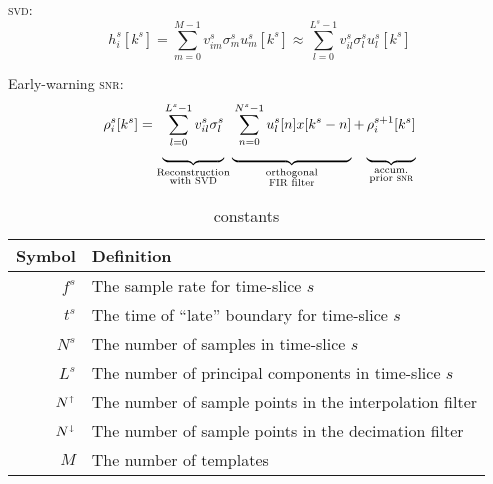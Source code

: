 \documentclass[letterpaper,11pt]{article}
\begin{document}
\textsc{svd}:
\begin{equation}
h^{s}_{i}\!\left[k^{s}\right] = \sum_{m=0}^{M-1} v^{s}_{im} \sigma^{s}_m u^{s}_{m}[k^{s}] \approx \sum_{l=0}^{L^s-1} v^{s}_{il} \sigma^{s}_l u^{s}_{l}[k^{s}]
\end{equation}

Early-warning \textsc{snr}:
\newcommand{\mystrut}{\rule[-2em]{0pt}{0pt}}  %
\begin{equation}
    \rho^{s}_i[k^{s}] = \underbrace{\mystrut\sum_{l=0}^{L^{s}-1} v^{s}_{il} \sigma^{s}_l}_{\substack{\text{Reconstruction}\\ \text{with {\sc SVD}}}}
    \underbrace{\mystrut\sum_{n=0}^{N^{s} - 1} u^{s}_{l}[n] x[k^{s}-n]}_{\substack{\text{orthogonal}\\ \text{{\sc FIR} filter}}} + 
    \underbrace{\mystrut\rho^{s+1}_i[k^{s}]}_{\substack{\text{accum.}\\ \text{prior {\sc snr}}}}
\end{equation}

\begin{table}
\begin{tabular}{rl}
\hline
\textbf{Symbol} & \textbf{Definition} \\\hline
$f^{s}$ & The sample rate for time-slice $s$\\
$t^{s}$ & The time of ``late'' boundary for time-slice $s$\\
$N^{s}$ & The number of samples in time-slice $s$\\
$L^{s}$ & The number of principal components in time-slice $s$\\
$N^\shortuparrow$ & The number of sample points in the interpolation filter\\
$N^\shortdownarrow$ & The number of sample points in the decimation filter\\
$M$ & The number of templates\\
\hline
\end{tabular}
\caption{constants}
\end{table}
\end{document}
